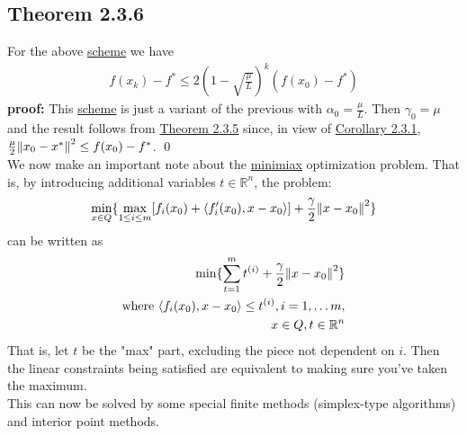 \documentclass[12pt,a4paper]{article}
\begin{document}
	 \subsection*{Theorem 2.3.6}\label{thm236}
	 For the above \hyperref[sec:mmschemestrict]{scheme} we have
	 \begin{align*}
	 	f(x_k) - f^* \leq 2(1 - \sqrt{\frac{\mu}{L}})^k(f(x_0) - f^*)
	 \end{align*}
	 \textbf{proof:} This \hyperref[sec:mmschemestrict]{scheme} is just a variant of the previous with $\alpha_0 = \frac{\mu}{L}$. Then $\gamma_0 = \mu$ and the result follows from \hyperref[thm235]{Theorem 2.3.5} since, in view of \hyperref[cor231]{Corollary 2.3.1}, $\frac{\mu}{2}\norm{x_0 - x^*}^2 \leq f(x_0) - f^*$.	 \qed \\
	 We now make an important note about the \hyperref[minimax23]{minimiax} optimization problem. That is, by introducing additional variables $t \in \mathbb{R}^n$, the problem:
	 \begin{align*}
	 	\min_{x \in Q}\{\max_{1 \leq i \leq m}[f_i(x_0) + \langle f_i'(x_0), x - x_0 \rangle] + \frac{\gamma}{2}\norm{x - x_0}^2\}
	 \end{align*}
	 can be written as
	 \begin{align*}
	 	\min\{\sum_{t=1}^{m}t^{(i)} + \frac{\gamma}{2}\norm{x - x_0}^2\} \\
	 	\text{where  } \langle f_i(x_0), x - x_0 \rangle \leq t^{(i)}, i = 1, \ldots m, \\
	 	x \in Q, t \in \mathbb{R}^n
	 \end{align*}
	 That is, let $t$ be the "max" part, excluding the piece not dependent on $i$. Then the linear constraints being satisfied are equivalent to making sure you've taken the maximum. \\
	 This can now be solved by some special finite methods (simplex-type algorithms) and interior point methods.
\end{document}
